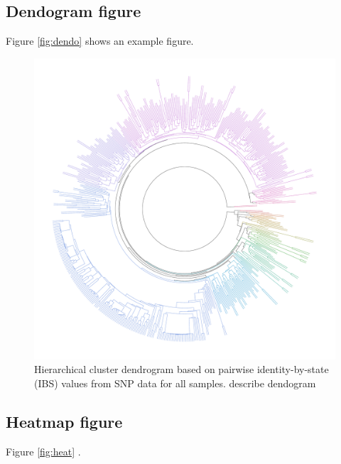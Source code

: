 \documentclass[9pt, onecolumn,twoside]{gsajnl}
\begin{document}
\subsection{Dendogram figure}

Figure \ref{fig:dendo} shows an example figure.

\begin{figure}[t]
\centering
\includegraphics[width=\linewidth]{rainbow.pdf}
\caption{Hierarchical cluster dendrogram based on pairwise identity-by-state (IBS) values from SNP data for all samples. describe dendogram}%
\label{fig:pca}
\end{figure}



\subsection{Heatmap figure}


Figure \ref{fig:heat} .
\end{document}
